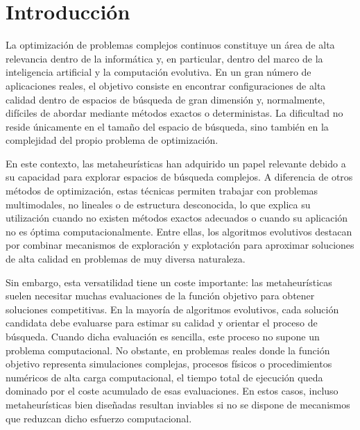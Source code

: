 
\chapter{Introducción}
\label{chap:introduccion}

La optimización de problemas complejos continuos constituye un área de alta relevancia dentro de la informática y, en particular, dentro del marco de la inteligencia artificial y la computación evolutiva. En un gran número de aplicaciones reales, el objetivo consiste en encontrar configuraciones de alta calidad dentro de espacios de búsqueda de gran dimensión y, normalmente, difíciles de abordar mediante métodos exactos o deterministas. La dificultad no reside únicamente en el tamaño del espacio de búsqueda, sino también en la complejidad del propio problema de optimización.

En este contexto, las metaheurísticas han adquirido un papel relevante debido a su capacidad para explorar espacios de búsqueda complejos. A diferencia de otros métodos de optimización, estas técnicas permiten trabajar con problemas multimodales, no lineales o de estructura desconocida, lo que explica su utilización cuando no existen métodos exactos adecuados o cuando su aplicación no es óptima computacionalmente. Entre ellas, los algoritmos evolutivos destacan por combinar mecanismos de exploración y explotación para aproximar soluciones de alta calidad en problemas de muy diversa naturaleza.

Sin embargo, esta versatilidad tiene un coste importante: las metaheurísticas suelen necesitar muchas evaluaciones de la función objetivo para obtener soluciones competitivas. En la mayoría de algoritmos evolutivos, cada solución candidata debe evaluarse para estimar su calidad y orientar el proceso de búsqueda. Cuando dicha evaluación es sencilla, este proceso no supone un problema computacional. No obstante, en problemas reales donde la función objetivo representa simulaciones complejas, procesos físicos o procedimientos numéricos de alta carga computacional, el tiempo total de ejecución queda dominado por el coste acumulado de esas evaluaciones. En estos casos, incluso metaheurísticas bien diseñadas resultan inviables si no se dispone de mecanismos que reduzcan dicho esfuerzo computacional.

